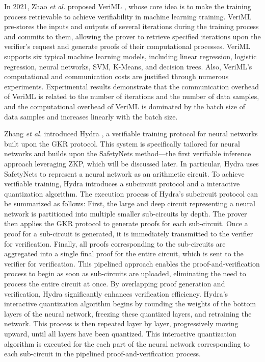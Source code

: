 \documentclass[journal]{IEEEtran}
\begin{document}
In 2021, Zhao \emph{et al.} proposed VeriML \cite{zhao2021veriml}, whose core idea is to make the training process retrievable to achieve verifiability in machine learning training. VeriML pre-stores the inputs and outputs of several iterations during the training process and commits to them, allowing the prover to retrieve specified iterations upon the verifier's request and generate proofs of their computational processes. VeriML supports six typical machine learning models, including linear regression, logistic regression, neural networks, SVM, K-Means, and decision trees. Also, VeriML's computational and communication costs are justified through numerous experiments. Experimental results demonstrate that the communication overhead of VeriML is related to the number of iterations and the number of data samples, and the computational overhead of VeriML is dominated by the batch size of data samples and increases linearly with the batch size.

Zhang \emph{et al.} introduced Hydra \cite{zhang2021hydra}, a verifiable training protocol for neural networks built upon the GKR protocol. This system is specifically tailored for neural networks and builds upon the SafetyNets method---the first verifiable inference approach leveraging ZKP, which will be discussed later. In particular, Hydra uses SafetyNets to represent a neural network as an arithmetic circuit. To achieve verifiable training, Hydra introduces a subcircuit protocol and a  interactive quantization algorithm. The execution process of Hydra's subcircuit protocol can be summarized as follows: First, the large and deep circuit representing a neural network is partitioned into multiple smaller sub-circuits by depth. The prover then applies the GKR protocol to generate proofs for each sub-circuit. Once a proof for a sub-circuit is generated, it is immediately transmitted to the verifier for verification. Finally, all proofs corresponding to the sub-circuits are aggregated into a single final proof for the entire circuit, which is sent to the verifier for verification. This pipelined approach enables the proof-and-verification process to begin as soon as sub-circuits are uploaded, eliminating the need to process the entire circuit at once. By overlapping proof generation and verification, Hydra significantly enhances verification efficiency. Hydra's interactive quantization algorithm begins by rounding the weights of the bottom layers of the neural network, freezing these quantized layers, and retraining the network. This process is then repeated layer by layer, progressively moving upward, until all layers have been quantized. This interactive quantization algorithm is executed for the each part of the neural network corresponding to each sub-circuit in the pipelined proof-and-verification process. 
\end{document}
